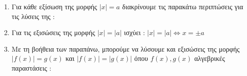 \documentclass[twoside,11pt,a4paper,openany]{book}
\begin{document}
\begin{enumerate}[itemsep=0mm]
\item Για κάθε εξίσωση της μορφής $ |x|=a $ διακρίνουμε τις παρακάτω περιπτώσεις για τις λύσεις της :
\item Για τις εξισώσεις της μορφής $ |x|=|a| $ ισχύει : $ |x|=|a|\Leftrightarrow x=\pm a $
\item Με τη βοήθεια των παραπάνω, μπορούμε να λύσουμε και εξισώσεις της μορφής $ \left|f(x) \right|=g(x)  $ και $ \left|f(x) \right| =\left|g(x) \right|  $ όπου $ f(x),g(x) $ αλγεβρικές παραστάσεις :
\end{enumerate}
\end{document}
